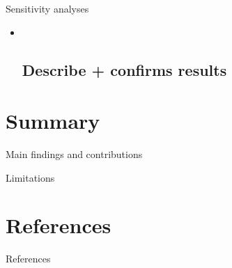\documentclass[ignorenonframetext,]{beamer}
\begin{document}
\begin{frame}{Sensitivity analyses}

\begin{itemize}[<+->]
\item ~
  \subsection{Describe + confirms
  results}\label{describe-confirms-results}
\end{itemize}

\end{frame}

\section{Summary}\label{summary}

\begin{frame}{Main findings and contributions}

\end{frame}

\begin{frame}{Limitations}

\end{frame}

\begin{frame}

\end{frame}

\section{References}\label{references}

\begin{frame}{References}

\end{frame}
\end{document}
